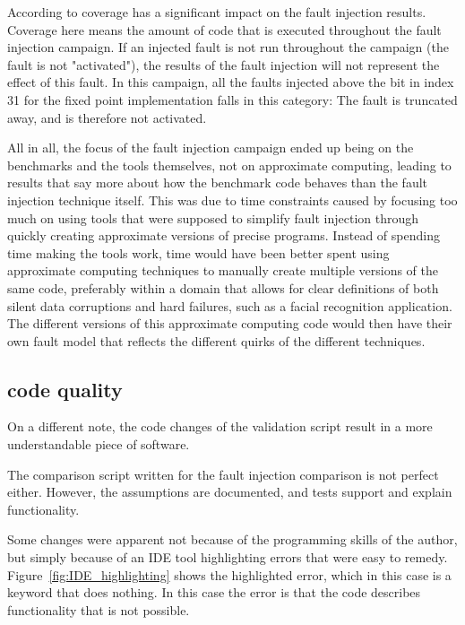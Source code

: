 According to \citep{van2016finding} coverage has a significant impact on the fault injection results. Coverage here means the amount of code that is executed throughout the fault injection campaign. If an injected fault is not run throughout the campaign (the fault is not "activated"), the results of the fault injection will not represent the effect of this fault. In this campaign, all the faults injected above the bit in index 31 for the fixed point implementation falls in this category: The fault is truncated away, and is therefore not activated. 

All in all, the focus of the fault injection campaign ended up being on the benchmarks and the tools themselves, not on approximate computing, leading to results that say more about how the benchmark code behaves than the fault injection technique itself. This was due to time constraints caused by focusing too much on using tools that were supposed to simplify fault injection through quickly creating approximate versions of precise programs. Instead of spending time making the tools work, time would have been better spent using approximate computing techniques to manually create multiple versions of the same code, preferably within a domain that allows for clear definitions of both silent data corruptions and hard failures, such as a facial recognition application. The different versions of this approximate computing code would then have their own fault model that reflects the different quirks of the different techniques. 



\subsection{code quality}

On a different note, the code changes of the validation script result in a more understandable piece of software.

The comparison script written for the fault injection comparison is not perfect either. However, the assumptions are documented, and tests support and explain functionality. 

Some changes were apparent not because of the programming skills of the author, but simply because of an IDE tool highlighting errors that were easy to remedy. Figure~\ref{fig:IDE_highlighting} shows the highlighted error, which in this case is a keyword that does nothing. In this case the error is that the code describes functionality that is not possible.

